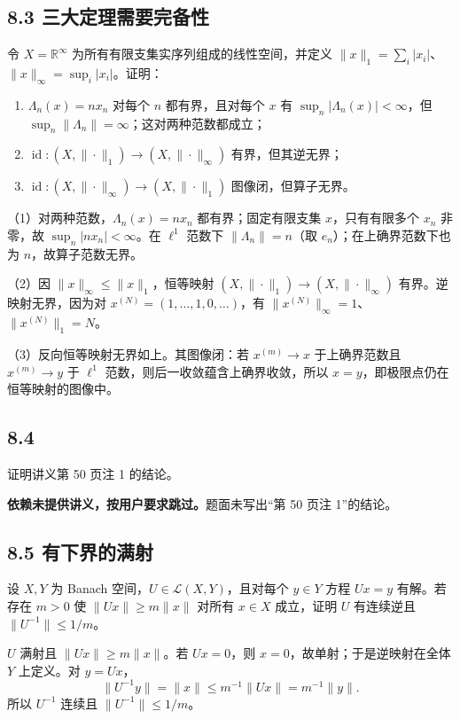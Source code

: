 \subsection*{8.3 三大定理需要完备性}
\begin{problem}
令 $X=\mathbb R^\infty$ 为所有有限支集实序列组成的线性空间，并定义
$\|x\|_1=\sum_i|x_i|$、$\|x\|_\infty=\sup_i|x_i|$。证明：
\begin{enumerate}[label=(\arabic*)]
\item $\Lambda_n(x)=nx_n$ 对每个 $n$ 都有界，且对每个 $x$ 有
$\sup_n|\Lambda_n(x)|<\infty$，但 $\sup_n\|\Lambda_n\|=\infty$；这对两种范数都成立；
\item $\operatorname{id}:(X,\|\cdot\|_1)\to(X,\|\cdot\|_\infty)$ 有界，但其逆无界；
\item $\operatorname{id}:(X,\|\cdot\|_\infty)\to(X,\|\cdot\|_1)$ 图像闭，但算子无界。
\end{enumerate}
\end{problem}
（1）对两种范数，$\Lambda_n(x)=nx_n$ 都有界；固定有限支集 $x$，只有有限多个 $x_n$ 非零，故
$\sup_n|nx_n|<\infty$。在 $\ell^1$ 范数下 $\|\Lambda_n\|=n$（取 $e_n$）；在上确界范数下也为 $n$，故算子范数无界。

（2）因 $\|x\|_\infty\le\|x\|_1$，恒等映射
$(X,\|\cdot\|_1)\to(X,\|\cdot\|_\infty)$ 有界。逆映射无界，因为对
$x^{(N)}=(1,\ldots,1,0,\ldots)$，有 $\|x^{(N)}\|_\infty=1$、$\|x^{(N)}\|_1=N$。

（3）反向恒等映射无界如上。其图像闭：若 $x^{(m)}\to x$ 于上确界范数且
$x^{(m)}\to y$ 于 $\ell^1$ 范数，则后一收敛蕴含上确界收敛，所以 $x=y$，即极限点仍在恒等映射的图像中。

\subsection*{8.4}
\begin{problem}
证明讲义第 50 页注 1 的结论。
\end{problem}
\textbf{依赖未提供讲义，按用户要求跳过。}题面未写出“第 50 页注 1”的结论。

\subsection*{8.5 有下界的满射}
\begin{problem}
设 $X,Y$ 为 Banach 空间，$U\in\mathcal L(X,Y)$，且对每个 $y\in Y$ 方程 $Ux=y$ 有解。若存在 $m>0$ 使
$\|Ux\|\ge m\|x\|$ 对所有 $x\in X$ 成立，证明 $U$ 有连续逆且
$\|U^{-1}\|\le1/m$。
\end{problem}
$U$ 满射且 $\|Ux\|\ge m\|x\|$。若 $Ux=0$，则 $x=0$，故单射；于是逆映射在全体 $Y$ 上定义。对 $y=Ux$，
\[
\|U^{-1}y\|=\|x\|\le m^{-1}\|Ux\|=m^{-1}\|y\|.
\]
所以 $U^{-1}$ 连续且 $\|U^{-1}\|\le1/m$。

